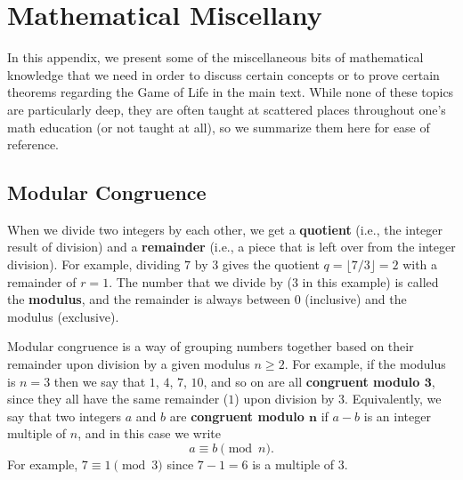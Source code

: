 
\renewcommand{\chapterfolder}{appendices/}

\chapter{Mathematical Miscellany}\label{app:math}

In this appendix, we present some of the miscellaneous bits of mathematical knowledge that we need in order to discuss certain concepts or to prove certain theorems regarding the Game of Life in the main text. While none of these topics are particularly deep, they are often taught at scattered places throughout one's math education (or not taught at all), so we summarize them here for ease of reference.


\section{Modular Congruence}\label{sec:modular_arithmetic}

When we divide two integers by each other, we get a \textbf{quotient} (i.e., the integer result of division) and a \textbf{remainder} (i.e., a piece that is left over from the integer division). For example, dividing $7$ by $3$ gives the quotient $q = \lfloor 7/3 \rfloor = 2$ with a remainder of $r = 1$. The number that we divide by ($3$ in this example) is called the \textbf{modulus}, and the remainder is always between $0$ (inclusive) and the modulus (exclusive).

Modular congruence is a way of grouping numbers together based on their remainder upon division by a given modulus $n \geq 2$. For example, if the modulus is $n = 3$ then we say that $1$, $4$, $7$, $10$, and so on are all \textbf{congruent modulo $\mathbf{3}$}, since they all have the same remainder ($1$) upon division by $3$. Equivalently, we say that two integers $a$ and $b$ are \textbf{congruent modulo $\mathbf{n}$} if $a-b$ is an integer multiple of $n$, and in this case we write
\[
	a \equiv b \pmod{n}.
\]
For example, $7 \equiv 1 \pmod{3}$ since $7 - 1 = 6$ is a multiple of $3$.

